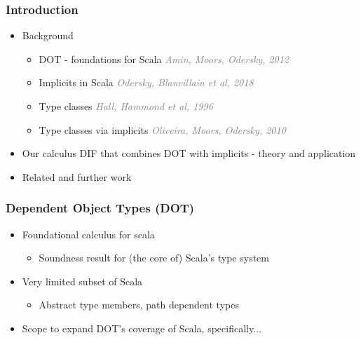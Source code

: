 \begin{frame}
    \titlepage
\end{frame}

\begin{frame}
    \frametitle{Introduction}
    \begin{itemize}
        \pause
        \item Background
        \begin{itemize}
            \item DOT - foundations for Scala \hfill
                \textcolor{grey}{\emph{Amin, Moors, Odersky, 2012}}
            \item Implicits in Scala \hfill \textcolor{grey}{\emph{Odersky,
                Blanvillain et al, 2018}}
            \item Type classes \hfill \textcolor{grey}{\emph{Hall, Hammond et
                al, 1996}}
            \item Type classes via implicits \hfill
                \textcolor{grey}{\emph{Oliveira, Moors, Odersky, 2010}}
        \end{itemize}
        \pause
        \item Our calculus DIF that combines DOT with implicits - theory and
            application
        \pause
        \item Related and further work
    \end{itemize}
\end{frame}

\begin{frame}
\end{frame}

\begin{frame}
    \frametitle{Dependent Object Types (DOT)}
    \begin{itemize}
        \pause
        \item Foundational calculus for scala
        \begin{itemize}
            \pause
            \item Soundness result for (the core of) Scala's type system
        \end{itemize}
        \pause
        \item Very limited subset of Scala
        \begin{itemize}
            \pause
            \item Abstract type members, path dependent types
        \end{itemize}
        \pause
        \item Scope to expand DOT's coverage of Scala\pause, specifically...
    \end{itemize}
\end{frame}

